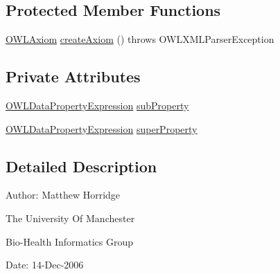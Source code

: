 \subsection*{Protected Member Functions}
\begin{DoxyCompactItemize}
\item 
\hyperlink{interfaceorg_1_1semanticweb_1_1owlapi_1_1model_1_1_o_w_l_axiom}{O\-W\-L\-Axiom} \hyperlink{classorg_1_1coode_1_1owlapi_1_1owlxmlparser_1_1_o_w_l_sub_data_property_of_axiom_element_handler_a3d7a5237343b0d4ccd962b5a05531546}{create\-Axiom} ()  throws O\-W\-L\-X\-M\-L\-Parser\-Exception 
\end{DoxyCompactItemize}
\subsection*{Private Attributes}
\begin{DoxyCompactItemize}
\item 
\hyperlink{interfaceorg_1_1semanticweb_1_1owlapi_1_1model_1_1_o_w_l_data_property_expression}{O\-W\-L\-Data\-Property\-Expression} \hyperlink{classorg_1_1coode_1_1owlapi_1_1owlxmlparser_1_1_o_w_l_sub_data_property_of_axiom_element_handler_ac7b5ddbd55ed600f501c7e83f52b47b3}{sub\-Property}
\item 
\hyperlink{interfaceorg_1_1semanticweb_1_1owlapi_1_1model_1_1_o_w_l_data_property_expression}{O\-W\-L\-Data\-Property\-Expression} \hyperlink{classorg_1_1coode_1_1owlapi_1_1owlxmlparser_1_1_o_w_l_sub_data_property_of_axiom_element_handler_aa7785727f18576916264ecaa373409d5}{super\-Property}
\end{DoxyCompactItemize}


\subsection{Detailed Description}
Author\-: Matthew Horridge\par
 The University Of Manchester\par
 Bio-\/\-Health Informatics Group\par
 Date\-: 14-\/\-Dec-\/2006\par
\par
 

